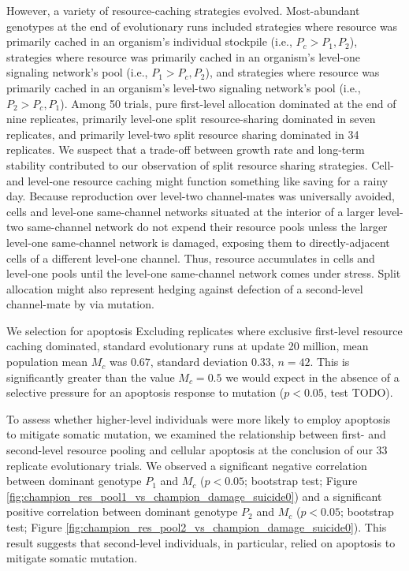 However, a variety of resource-caching strategies evolved.
Most-abundant genotypes at the end of evolutionary runs included strategies where resource was primarily cached in an organism's individual stockpile (i.e., $P_{c} > P_1, P_2$), strategies where resource was primarily cached in an organism's level-one signaling network's pool (i.e., $P_1 > P_{c}, P_2$), and strategies where resource was primarily cached in an organism's level-two signaling network's pool (i.e., $P_2 > P_{c}, P_1$).
Among 50 trials, pure first-level allocation dominated at the end of nine replicates, primarily level-one split resource-sharing dominated in seven replicates, and primarily level-two split resource sharing dominated in 34 replicates.
We suspect that a trade-off between growth rate and long-term stability contributed to our observation of split resource sharing strategies.
Cell- and level-one resource caching might function something like saving for a rainy day.
Because reproduction over level-two channel-mates was universally avoided, cells and level-one same-channel networks situated at the interior of a larger level-two same-channel network do not expend their resource pools unless the larger level-one same-channel network is damaged, exposing them to directly-adjacent cells of a different level-one channel.
Thus, resource accumulates in cells and level-one pools until the level-one same-channel network comes under stress.
Split allocation might also represent hedging against defection of a second-level channel-mate by via mutation.

We selection for apoptosis
Excluding replicates where exclusive first-level resource caching dominated, standard evolutionary runs at update 20 million, mean population mean $M_{c}$ was $0.67$, standard deviation 0.33, $n=42$.
This is significantly greater than the value $M_{c} = 0.5$ we would expect in the absence of a selective pressure for an apoptosis response to mutation ($p < 0.05$, test TODO).



To assess whether higher-level individuals were more likely to employ apoptosis to mitigate somatic mutation, we examined the relationship between first- and second-level resource pooling and cellular apoptosis at the conclusion of our 33 replicate evolutionary trials.
We observed a significant negative correlation between dominant genotype $P_1$ and $M_{c}$ ($p < 0.05$; bootstrap test; Figure \ref{fig:champion_res_pool1_vs_champion_damage_suicide0}) and a significant positive correlation between dominant genotype $P_2$ and $M_{c}$ ($p < 0.05$; bootstrap test; Figure \ref{fig:champion_res_pool2_vs_champion_damage_suicide0}).
This result suggests that second-level individuals, in particular, relied on apoptosis to mitigate somatic mutation.


